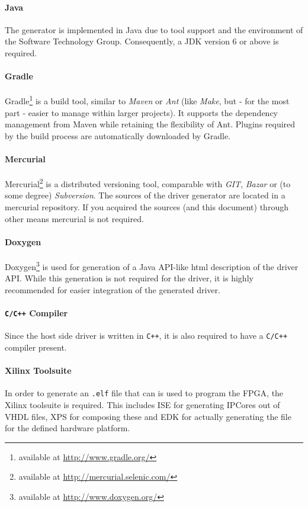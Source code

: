 \documentclass{report}
\begin{document}
\paragraph{Java}
The generator is implemented in Java due to tool support and the environment of the Software Technology Group. Consequently, a JDK version 6 or above is required. %

\paragraph{Gradle}
Gradle\footnote{available at \url{http://www.gradle.org/}} is a build tool, similar to \textit{Maven} or \textit{Ant} (like \textit{Make}, but - for the most part - easier to manage within larger projects). It supports the dependency management from Maven while retaining the flexibility of Ant. Plugins required by the build process are automatically downloaded by Gradle.

\paragraph{Mercurial}
Mercurial\footnote{available at \url{http://mercurial.selenic.com/}} is a distributed versioning tool, comparable with \textit{GIT}, \textit{Bazar} or (to some degree) \textit{Subversion}. The sources of the driver generator are located in a mercurial repository. If you acquired the sources (and this document) through other means mercurial is not required.

\paragraph{Doxygen}
Doxygen\footnote{available at \url{http://www.doxygen.org/}} is used for generation of a Java API-like html description of the driver API. While this generation is not required for the driver, it is highly recommended for easier integration of the generated driver.

\paragraph{\texttt{C/C++} Compiler}
Since the host side driver is written in \texttt{C++}, it is also required to have a \texttt{C/C++} compiler present.

\paragraph{Xilinx Toolsuite}
In order to generate an \texttt{.elf} file that can is used to program the FPGA, the Xilinx toolsuite is required. This includes ISE for generating IPCores out of VHDL files, XPS for composing these and EDK for actually generating the file for the defined hardware platform.
\end{document}
